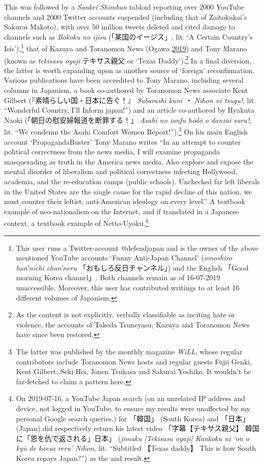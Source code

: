 \documentclass[10pt,british,A4paper,,openany]{memoir}
\begin{document}
This was followed by a \emph{Sankei Shimbun} tabloid reporting over 2000
YouTube channels and 2000 Twitter accounts suspended (including that of
Zaitokukai's Sakurai Makoto), with over 50 million tweets deleted and
cited damage to channels such as \emph{Bōkoku no ījisu}
(「某国のイージス」, lit. `A Certain Country's Isis'),\footnote{This
  user runs a Twitter-account @defendjapan and is the owner of the above
  mentioned YouTube accounts `Funny Anti-Japan Channel' (\emph{omoshiro
  han'nichi chan'neru} 「おもしろ反日チャンネル」) and the English
  「Good morning Korea channel」. Both channels remain as of 16-07-2019
  unaccessible. Moreover, this user has contributed writings to at least
  16 different volumes of Japanism.} that of Kazuya and Toranomon News
(Ogawa \protect\hyperlink{ref-ogawa_eng._2019}{2019}) and Tony Marano
(known as \emph{tekisasu oyaji} テキサス親父 or `Texas
Daddy').\footnote{As the content is not explicitly, verbally
  classifiable as inciting hate or violence, the accounts of Takeda
  Tsuneyasu, Kazuya and Toranomon News have since been restored.} In a
final diversion, the latter is worth expanding upon as another source of
`foreign' reconfirmation. Various publications have been accredited to
Tony Marano, including several columns in Japanism, a book co-authored
by Toranomon News associate Kent Gilbert (『素晴らしい国・日本に告ぐ！』
\emph{Subarashī kuni ・ Nihon ni tsugu!}, lit. ``Wonderful Country, I'll
Inform japan!'') and an article co-authored by Hyakuta Naoki
(「朝日の慰安婦報道を断罪する！」 \emph{Asahi no ianfu hōdō o danzai
suru!}, lit. ``We condemn the Asahi Comfort Women Report!'').\footnote{The
  latter was published by the monthly magazine \emph{WiLL}, whose
  regular contributors include Toranomon News hosts and regular guests
  Fujii Genki, Kent Gilbert, Seki Hei, Jōnen Tsukasa and Sakurai
  Yoshiko. It wouldn't be far-fetched to claim a pattern here.} On his
main English account `PropagandaBuster' Tony Marano writes ``In an
attempt to counter political correctness from the news media, I will
examine propaganda masquerading as truth in the America news media. Also
explore and expose the mental disorder of liberalism and political
correctness infecting Hollywood, academia, and the re-education camps
(public schools). Unchecked far left liberals in the United States are
the single cause for the rapid decline of this nation, we must counter
their leftist, anti-American ideology on every level.'' A textbook
example of neo-nationalism on the Internet, and if translated in a
Japanese context, a textbook example of Netto-Uyoku.\footnote{On
  2019-07-16, a YouTube Japan search (on an unrelated IP address and
  device, not logged in YouTube, to ensure my results were unaffected by
  my personal Google search queries.) for 「韓国」 (South Korea) and
  「日本」 (Japan) did respectively return his latest video
  「字幕【テキサス親父】 韓国に「恩を仇で返される」日本」 (\emph{jimaku
  {[}Tekisasu oyaji{]} Kankoku ni `on o kyū de kaesa reru' Nihon}, lit.
  ``Subtitled 【Texas daddy】 This is how South Korea repays Japan?'')
  as the  and  result.}
\end{document}
